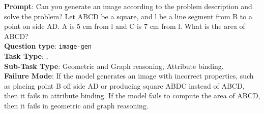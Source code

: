 \begin{tcolorbox}[title={Multi category example}, size=title,colback=gray!10, colframe=gray, boxrule=0.5pt,
  arc=2mm, left=2mm, right=2mm, top=1mm, bottom=1mm,,breakable ]
\noindent
\textbf{Prompt}: Can you generate an image according to the problem description and solve the problem? Let ABCD be a square, and l be a line segment from B to a point on side AD. A is 5 cm from l and C is 7 cm from l. What is the area of ABCD? \\

\textbf{Question type}: \texttt{image-gen}\\

\textbf{Task Type}: , \\

\textbf{Sub-Task Type}: Geometric and Graph reasoning, Attribute binding.\\

\textbf{Failure Mode}: If the model generates an image with incorrect properties, such as placing point B off side AD or producing square ABDC instead of ABCD, then it fails in attribute binding.
If the model fails to compute the area of ABCD, then it fails in geometric and graph reasoning.
\end{tcolorbox}
